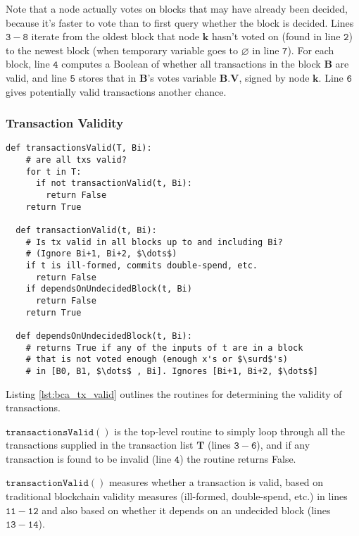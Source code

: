 Note that a node actually votes on blocks that may have already been decided, because it’s faster to vote than to first query whether the block is decided.
Lines $\mathtt{3-8}$ iterate from the oldest block that node $\mathbf{k}$ hasn’t voted on (found in line $\mathtt{2}$) to the newest block (when temporary variable goes to $\varnothing$ in line $\mathtt{7}$).
For each block, line $\mathtt{4}$ computes a Boolean of whether all transactions in the block $\mathbf{B}$ are valid, and line $\mathtt{5}$ stores that in $\mathbf{B}$’s votes variable $\mathbf{B.V}$, signed by node $\mathbf{k}$.
Line $\mathtt{6}$ gives potentially valid transactions another chance.

\subsubsection{Transaction Validity}

\begin{minipage}{\linewidth}
  \begin{lstlisting}[caption={Routines for transaction validity.}, label={lst:bca_tx_valid}, style=python, mathescape=true]
  def transactionsValid(T, Bi):
    # are all txs valid?
    for t in T:
      if not transactionValid(t, Bi):
        return False
    return True
  
  def transactionValid(t, Bi):
    # Is tx valid in all blocks up to and including Bi? 
    # (Ignore Bi+1, Bi+2, $\dots$) 
    if t is ill-formed, commits double-spend, etc. 
      return False
    if dependsOnUndecidedBlock(t, Bi)
      return False
    return True
    
  def dependsOnUndecidedBlock(t, Bi):
    # returns True if any of the inputs of t are in a block 
    # that is not voted enough (enough x's or $\surd$'s) 
    # in [B0, B1, $\dots$ , Bi]. Ignores [Bi+1, Bi+2, $\dots$]
  \end{lstlisting}
\end{minipage}

\medskip
\noindent Listing \ref{lst:bca_tx_valid} outlines the routines for determining the validity of transactions.

\medskip
\noindent $\mathtt{transactionsValid()}$ is the top-level routine to simply loop through all the transactions supplied in the transaction list $\mathbf{T}$ (lines $\mathtt{3-6}$), and if any transaction is found to be invalid (line $\mathtt{4}$) the routine returns False.

\medskip
\noindent $\mathtt{transactionValid()}$ measures whether a transaction is valid, based on traditional blockchain validity measures (ill-formed, double-spend, etc.) in lines $\mathtt{11-12}$ and also based on whether it depends on an undecided block (lines $\mathtt{13-14}$).

